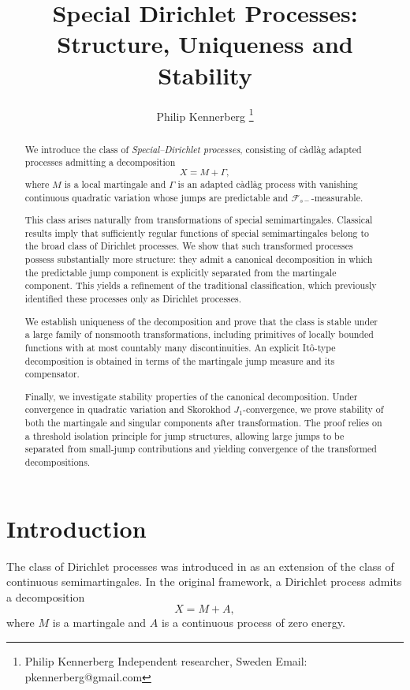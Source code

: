 \documentclass[a4paper,10pt]{article}
\title{Special Dirichlet Processes: Structure, Uniqueness and Stability}
\author{Philip Kennerberg
\footnote{Philip Kennerberg  
Independent researcher, Sweden  
Email: pkennerberg@gmail.com}
}
\begin{document}
\maketitle

\begin{abstract}
We introduce the class of \emph{Special--Dirichlet processes}, consisting of càdlàg adapted processes admitting a decomposition
\[
X=M+\Gamma,
\]
where \(M\) is a local martingale and \(\Gamma\) is an adapted càdlàg process with vanishing continuous quadratic variation whose jumps are predictable and \(\mathcal F_{s-}\)-measurable.

This class arises naturally from transformations of special semimartingales. Classical results imply that sufficiently regular functions of special semimartingales belong to the broad class of Dirichlet processes. We show that such transformed processes possess substantially more structure: they admit a canonical decomposition in which the predictable jump component is explicitly separated from the martingale component. This yields a refinement of the traditional classification, which previously identified these processes only as Dirichlet processes.

We establish uniqueness of the decomposition and prove that the class is stable under a large family of nonsmooth transformations, including primitives of locally bounded functions with at most countably many discontinuities. An explicit It\^o-type decomposition is obtained in terms of the martingale jump measure and its compensator.

Finally, we investigate stability properties of the canonical decomposition. Under convergence in quadratic variation and Skorokhod \(J_1\)-convergence, we prove stability of both the martingale and singular components after transformation. The proof relies on a threshold isolation principle for jump structures, allowing large jumps to be separated from small-jump contributions and yielding convergence of the transformed decompositions.
\end{abstract}

\section{Introduction}

The class of Dirichlet processes was introduced in
\cite{Fol} as an extension of the class of continuous
semimartingales. In the original framework, a Dirichlet
process admits a decomposition
\[
X=M+A,
\]
where \(M\) is a martingale and \(A\) is a continuous process of
zero energy.
\end{document}
